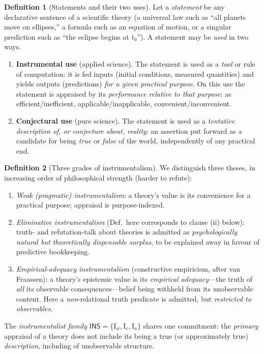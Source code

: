 \documentclass{amsart}
\theoremstyle{definition}
\newtheorem{definition}{Definition}
\theoremstyle{plain}
\begin{document}
\begin{definition}[Statements and their two uses]\label{def:uses}
Let a \emph{statement} be any declarative sentence of a scientific theory
(a universal law such as ``all planets move on ellipses,'' a formula such as
an equation of motion, or a singular prediction such as ``the eclipse begins
at $t_0$''). A statement may be \emph{used} in two ways.
\begin{enumerate}
\item[(A)] \textbf{Instrumental use} (applied science). The statement is used
as a \emph{tool} or rule of computation: it is fed inputs (initial conditions,
measured quantities) and yields outputs (predictions) \emph{for a given
practical purpose}. On this use the statement is appraised by its
\emph{performance relative to that purpose}: as efficient/inefficient,
applicable/inapplicable, convenient/inconvenient.
\item[(C)] \textbf{Conjectural use} (pure science). The statement is used as a
\emph{tentative description of, or conjecture about, reality}: an assertion put
forward as a candidate for being \emph{true} or \emph{false} of the world,
independently of any practical end.
\end{enumerate}
\end{definition}

\begin{definition}[Three grades of instrumentalism]\label{def:positions}
We distinguish three theses, in increasing order of philosophical strength
(harder to refute):
\begin{enumerate}
\item[(I$_w$)] \emph{Weak (pragmatic) instrumentalism}: a theory's value is its
convenience for a practical purpose; appraisal is purpose-indexed.
\item[(I$_e$)] \emph{Eliminative instrumentalism} (Def.\ here corresponds to
clause (ii) below): truth- and refutation-talk about theories is admitted as
\emph{psychologically natural but theoretically dispensable surplus}, to be
explained away in favour of predictive bookkeeping.
\item[(I$_a$)] \emph{Empirical-adequacy instrumentalism} (constructive
empiricism, after van Fraassen): a theory's epistemic value is its
\emph{empirical adequacy}---the truth of \emph{all} its observable
consequences---belief being withheld from its unobservable content. Here a
\emph{non}-relational truth predicate is admitted, but \emph{restricted to
observables}.
\end{enumerate}
The \emph{instrumentalist family} $\mathsf{INS}=\{\mathrm I_w,\mathrm
I_e,\mathrm I_a\}$ shares one commitment: the \emph{primary} appraisal of a
theory does not include its being a true (or approximately true)
\emph{description}, including of unobservable structure.
\end{definition}
\end{document}

